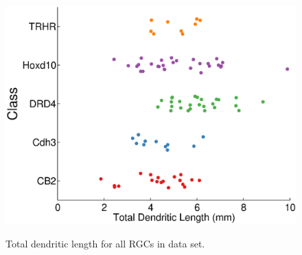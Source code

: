 \documentclass{article}
\begin{document}
\begin{figure}
  \centering
  {\includegraphics[scale=0.75]{Figures/SupFig3/plotFeatures-totalDendriticLength.eps}}
  \caption{Total dendritic length for all RGCs in data set.}
\end{figure}

\clearpage
\end{document}

